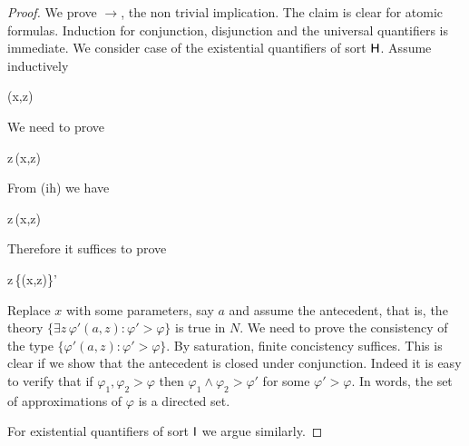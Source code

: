 \documentclass[10pt,oneside]{amsproc}
\def\existsH{\exists}
\begin{document}
\begin{proof}
  We prove $\rightarrow$, the non trivial implication.
  The claim is clear for atomic formulas.
  Induction for conjunction, disjunction and the universal quantifiers is immediate.
%
%
%
%
%
  We consider case of the existential quantifiers of sort ${\sf H}$.
  Assume inductively
  
  {\rightarrow}
  {\varphi(x,z)}

  We need to prove

  \ceq{\hfill\{\existsH z\,\varphi(x,z)\}'}
  {\rightarrow}
  {\existsH z\,\varphi(x,z)}

  From (ih) we have

  \ceq{\hfill\existsH z\,\{\varphi(x,z)\}'}
  {\rightarrow}
  {\existsH z\,\varphi(x,z)}

  Therefore it suffices to prove

  \ceq{\hfill\{\existsH z\,\varphi(x,z)\}'}
  {\rightarrow}
  {\existsH z\,\{\varphi(x,z)\}'}

Replace $x$ with some parameters, say $a$ and assume the antecedent, that is, the theory $\{\existsH z\,\varphi'(a,z):\varphi'>\varphi\}$ is true in $N$.
We need to prove the consistency of the type $\{\varphi'(a,z):\varphi'>\varphi\}$.
By saturation, finite concistency suffices.
This is clear if we show that the antecedent is closed under conjunction.
Indeed it is easy to verify that if $\varphi_1,\varphi_2>\varphi$ then $\varphi_1\wedge\varphi_2>\varphi'$ for some $\varphi'>\varphi$.
In words, the set of approximations of $\varphi$ is a directed set.

For existential quantifiers of sort ${\sf I}$ we argue similarly.%
%
%
%
%
%
\end{proof}
\end{document}
